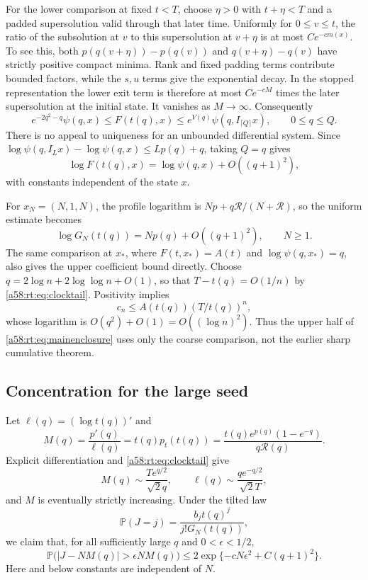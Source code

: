 \documentclass[11pt,letterpaper]{article}
\theoremstyle{remark}
\newcommand{\Pp}{\mathbb P}
\begin{document}
For the lower comparison at fixed $t<T$, choose $\eta>0$ with
$t+\eta<T$ and a padded supersolution valid through that later time.
Uniformly for $0\le v\le t$, the ratio of the subsolution at $v$ to
this supersolution at $v+\eta$ is at most $C e^{-c m(x)}$.
To see this, both $p(q(v+\eta))-p(q(v))$ and
$q(v+\eta)-q(v)$ have strictly positive compact minima. Rank and fixed
padding terms contribute bounded factors, while the $s,u$ terms give
the exponential decay. In the stopped representation the lower exit
term is therefore at most $Ce^{-cM}$ times the later supersolution at
the initial state. It vanishes as $M\to\infty$. Consequently
\begin{equation}\label{a58:rt:eq:barriers}
 e^{-2q^2-q}\psi(q,x)\le F(t(q),x)
 \le e^{V(q)}\psi(q,I_{\lceil Q\rceil}x),\qquad0\le q\le Q.
\end{equation}
There is no appeal to uniqueness for an unbounded differential system.
Since
$\log\psi(q,I_Lx)-\log\psi(q,x)\le Lp(q)+q$, taking $Q=q$ gives
\begin{equation}\label{a58:rt:eq:coarseuniform}
 \log F(t(q),x)=\log\psi(q,x)+O((q+1)^2),
\end{equation}
with constants independent of the state $x$.

For $x_N=(N,1,N)$, the profile logarithm is
$Np+q\mathcal R/(N+\mathcal R)$, so the uniform estimate becomes
\begin{equation}\label{a58:rt:eq:growing}
 \log G_N(t(q))=Np(q)+O((q+1)^2),\qquad N\ge1.
\end{equation}
The same comparison at $x_*$, where $F(t,x_*)=A(t)$ and
$\log\psi(q,x_*)=q$, also gives the upper coefficient bound directly.
Choose $q=2\log n+2\log\log n+O(1)$, so that
$T-t(q)=O(1/n)$ by \eqref{a58:rt:eq:clocktail}. Positivity implies
\[
 c_n\le A(t(q))(T/t(q))^n,
\]
whose logarithm is $O(q^2)+O(1)=O((\log n)^2)$.
Thus the upper half of \eqref{a58:rt:eq:mainenclosure} uses only the coarse
comparison, not the earlier sharp cumulative theorem.

\subsection{Concentration for the large seed}
Let $\ell(q)=(\log t(q))'$ and
\begin{equation}\label{a58:rt:eq:M}
 M(q)=\frac{p'(q)}{\ell(q)}=t(q)p_t(t(q))
 =\frac{t(q)e^{p(q)}(1-e^{-q})}{q\mathcal R(q)}.
\end{equation}
Explicit differentiation and \eqref{a58:rt:eq:clocktail} give
\begin{equation}\label{a58:rt:eq:Masymp}
 M(q)\sim\frac{T e^{q/2}}{\sqrt2 q},\qquad
 \ell(q)\sim\frac{q e^{-q/2}}{\sqrt2 T},
\end{equation}
and $M$ is eventually strictly increasing. Under the tilted law
\[
 \Pp(J=j)=\frac{b_jt(q)^j}{j!G_N(t(q))},
\]
we claim that, for all sufficiently large $q$ and $0<\epsilon<1/2$,
\begin{equation}\label{a58:rt:eq:chernoff}
 \Pp\bigl(|J-NM(q)|>\epsilon NM(q)\bigr)
 \le2\exp\{-cN\epsilon^2+C(q+1)^2\}.
\end{equation}
Here and below constants are independent of $N$.
\end{document}
